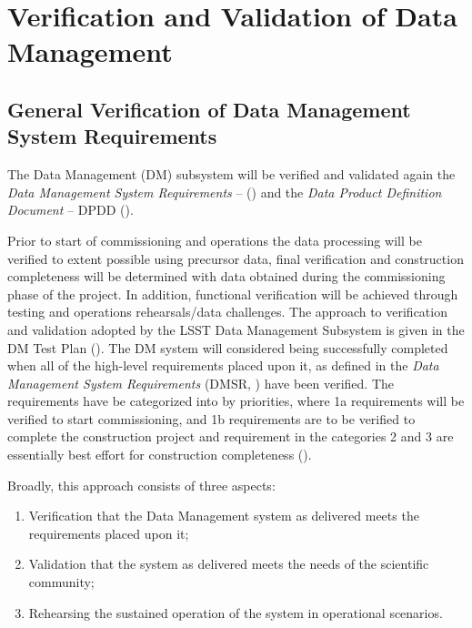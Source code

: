 \section{Verification and Validation of Data Management}  \label{sec:dm}

\subsection{General Verification of Data Management System Requirements   }

The Data Management (DM) subsystem will be verified and validated again the {\it Data Management System Requirements} -- () and the  {\it Data Product Definition Document} -- DPDD ().

Prior to start of commissioning and operations the data processing will be verified to extent possible using precursor data, final verification and construction completeness will be determined with data obtained during the commissioning phase of the project.  In addition, functional verification will be achieved through testing and operations rehearsals/data challenges.  The approach to verification and validation adopted by the LSST Data Management Subsystem is given in the DM Test Plan ().   The DM system will considered being successfully completed when all of the high-level requirements placed upon it, as defined in the {\it Data Management System Requirements} (DMSR,  ) have been verified.  The requirements have be categorized into by priorities, where 1a requirements will be verified to start commissioning, and 1b requirements are to be verified to complete the construction project and requirement in the categories 2 and 3 are essentially best effort for construction completeness ().

Broadly, this approach consists of three aspects:

\begin{enumerate}
	\item Verification that the Data Management system as delivered meets the requirements placed upon it;
	\item Validation that the system as delivered meets the needs of the scientific community;
	\item Rehearsing the sustained operation of the system in operational scenarios.
\end{enumerate}

